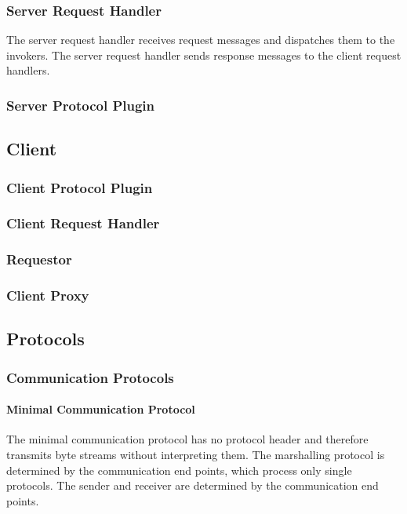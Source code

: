 \subsubsection{Server Request Handler}

The server request handler receives request messages and dispatches them to the invokers.
The server request handler sends response messages to the client request handlers.

\subsubsection{Server Protocol Plugin}

\subsection{Client}

\subsubsection{Client Protocol Plugin}

\subsubsection{Client Request Handler}

\subsubsection{Requestor}

\subsubsection{Client Proxy}

\subsection{Protocols}

\subsubsection{Communication Protocols}

\paragraph{Minimal Communication Protocol}

The minimal communication protocol has no protocol header and therefore transmits byte streams without interpreting them.
The marshalling protocol is determined by the communication end points, which process only single protocols.
The sender and receiver are determined by the communication end points.

